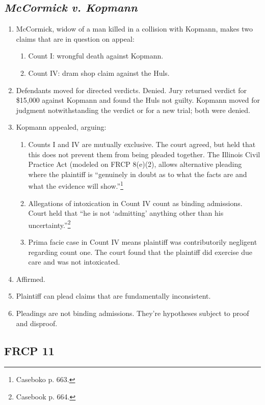 \subsection{\emph{McCormick v. Kopmann}}

\begin{enumerate}
    \item McCormick, widow of a man killed in a collision with Kopmann, makes two claims that are in question on appeal:
    \begin{enumerate}
        \item Count I: wrongful death against Kopmann.
        \item Count IV: dram shop claim against the Huls.
    \end{enumerate}
    \item Defendants moved for directed verdicts. Denied. Jury returned verdict for \$15,000 against Kopmann and found the Huls not guilty. Kopmann moved for judgment notwithstanding the verdict or for a new trial; both were denied. 
    \item Kopmann appealed, arguing:
    \begin{enumerate}
        \item Counts I and IV are mutually exclusive. The court agreed, but held that this does not prevent them from being pleaded together. The Illinois Civil Practice Act (modeled on FRCP 8(e)(2), allows alternative pleading where the plaintiff is ``genuinely in doubt as to what the facts are and what the evidence will show.''\footnote{Caseboko p. 663.}
        \item Allegations of intoxication in Count IV count as binding admissions. Court held that ``he is not `admitting' anything other than his uncertainty.''\footnote{Casebook p. 664.}
        \item Prima facie case in Count IV means plaintiff was contributorily negligent regarding count one. The court found that the plaintiff did exercise due care and was not intoxicated.
    \end{enumerate}
    \item Affirmed.
    \item Plaintiff can plead claims that are fundamentally inconsistent.
    \item Pleadings are not binding admissions. They're hypotheses subject to proof and disproof.
\end{enumerate}

\subsection{FRCP 11}

